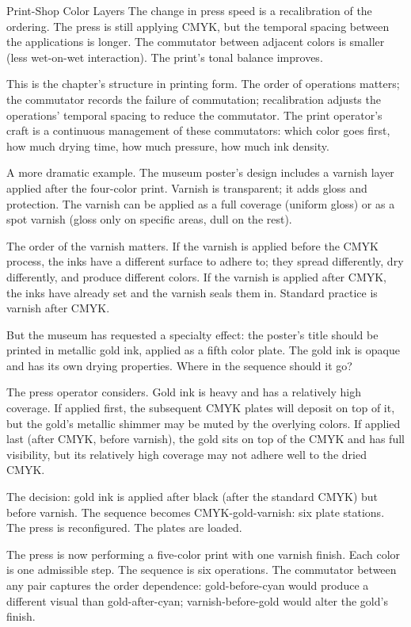 \begin{coda}{Print-Shop Color Layers}
The change in press speed is a recalibration of the ordering. The
press is still applying CMYK, but the temporal spacing between the
applications is longer. The commutator between adjacent colors is
smaller (less wet-on-wet interaction). The print's tonal balance
improves.

This is the chapter's structure in printing form. The order of
operations matters; the commutator records the failure of
commutation; recalibration adjusts the operations' temporal spacing
to reduce the commutator. The print operator's craft is a continuous
management of these commutators: which color goes first, how much
drying time, how much pressure, how much ink density.

A more dramatic example. The museum poster's design includes a
varnish layer applied after the four-color print. Varnish is
transparent; it adds gloss and protection. The varnish can be
applied as a full coverage (uniform gloss) or as a spot varnish
(gloss only on specific areas, dull on the rest).

The order of the varnish matters. If the varnish is applied before
the CMYK process, the inks have a different surface to adhere to;
they spread differently, dry differently, and produce different
colors. If the varnish is applied after CMYK, the inks have already
set and the varnish seals them in. Standard practice is varnish
after CMYK.

But the museum has requested a specialty effect: the poster's title
should be printed in metallic gold ink, applied as a fifth color
plate. The gold ink is opaque and has its own drying properties.
Where in the sequence should it go?

The press operator considers. Gold ink is heavy and has a relatively
high coverage. If applied first, the subsequent CMYK plates will
deposit on top of it, but the gold's metallic shimmer may be muted
by the overlying colors. If applied last (after CMYK, before varnish),
the gold sits on top of the CMYK and has full visibility, but its
relatively high coverage may not adhere well to the dried CMYK.

The decision: gold ink is applied after black (after the standard
CMYK) but before varnish. The sequence becomes CMYK-gold-varnish:
six plate stations. The press is reconfigured. The plates are
loaded.

The press is now performing a five-color print with one varnish
finish. Each color is one admissible step. The sequence is six
operations. The commutator between any pair captures the order
dependence: gold-before-cyan would produce a different visual
than gold-after-cyan; varnish-before-gold would alter the gold's
finish.


\end{coda}
